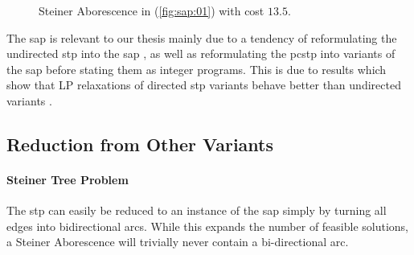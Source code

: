 \begin{figure}[h]\centering
{}
\caption{Steiner Aborescence in (\ref{fig:sap:01}) with cost $13.5$.}
\label{fig:sap:01:opt}
\end{figure}

The \gls{sap} is relevant to our thesis mainly due to a tendency of reformulating the
undirected \gls{stp} into the \gls{sap} \citep{koch1998solving}, as well as reformulating
the \gls{pcstp} into variants of the \gls{sap}
\citep{gamrath2017scip, Ljubic:2004:memetic, leitner2016dual, ljubic2005solving}
before stating them as integer programs. This is due to results which show that LP relaxations of
 directed \gls{stp} variants behave better than undirected variants \citep{chopra1994steiner}.

\subsection{Reduction from Other Variants}

\paragraph{Steiner Tree Problem}
The \gls{stp} can easily be reduced to an instance of the \gls{sap}
simply by turning all edges into bidirectional arcs. While this expands
the number of feasible solutions, a Steiner Aborescence will trivially never
contain a bi-directional arc.


